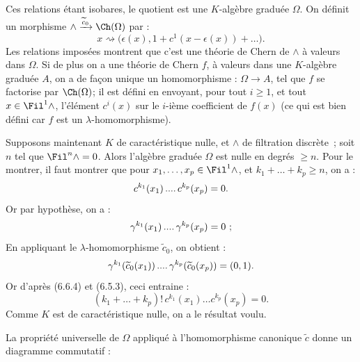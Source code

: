 

Ces
relations étant isobares, le quotient est une \(K\)-algèbre graduée \(\Omega\). On définit un morphisme \(\mathord{\wedge}\xrightarrow{\widetilde c_0}\Ch(\Omega)\) par :
\[
  x\rightsquigarrow
  \bigl(\epsilon(x),1+c^1(x-\epsilon(x))+\ldots\bigr).
\]
Les relations imposées montrent que c'est une théorie de Chern de \(\mathord{\wedge}\) à valeurs dans \(\Omega\). Si de plus on a une théorie de Chern \(f\), à valeurs dans une \(K\)-algèbre graduée \(A\), on a de façon unique un homomorphisme : \(\Omega\to A\), tel que \(f\) se factorise par \(\Ch(\Omega)\); il est défini en envoyant, pour tout \(i\ge1\), et tout \(x\in\Fil^1\mathord{\wedge}\), l'élément \(c^i(x)\) sur le \(i\)-ième coefficient de \(f(x)\) (ce qui est bien défini car \(f\) est un \(\lambda\)-homomorphisme).

Supposons maintenant \(K\) de caractéristique nulle, et \(\mathord{\wedge}\) de filtration discrète~; soit \(n\) tel que \(\Fil^n\mathord{\wedge}=0\). Alors l'algèbre graduée \(\Omega\) est nulle en degrés \(\ge n\). Pour le montrer, il faut montrer que pour \(x_1,\ldots,x_p\in\Fil^1\mathord{\wedge}\), et \(k_1+\ldots+k_p\ge n\), on a :
\[
  c^{k_1}(x_1)\mathinner{....}c^{k_p}(x_p)=0.
\]
Or par hypothèse, on a :
\[
  \gamma^{k_1}(x_1)\mathinner{....}\gamma^{k_p}(x_p)=0\ ;
\]
En appliquant le \(\lambda\)-homomorphisme \(\widetilde c_0\), on obtient :
\[
  \gamma^{k_1}(\widetilde c_0(x_1))\mathinner{....}
  \gamma^{k_p}(\widetilde c_0(x_p))=(0,1).
\]
Or d'après (6.6.4) et (6.5.3), ceci entraine :
\[
  (k_1+\ldots+k_p)!\,
  c^{k_1}(x_1)\ldots c^{k_p}(x_p)=0.
\]
Comme \(K\) est de caractéristique nulle, on a le résultat voulu.

La propriété universelle de \(\Omega\) appliqué à l'homomorphisme canonique \(\widetilde c\) donne un diagramme commutatif :
